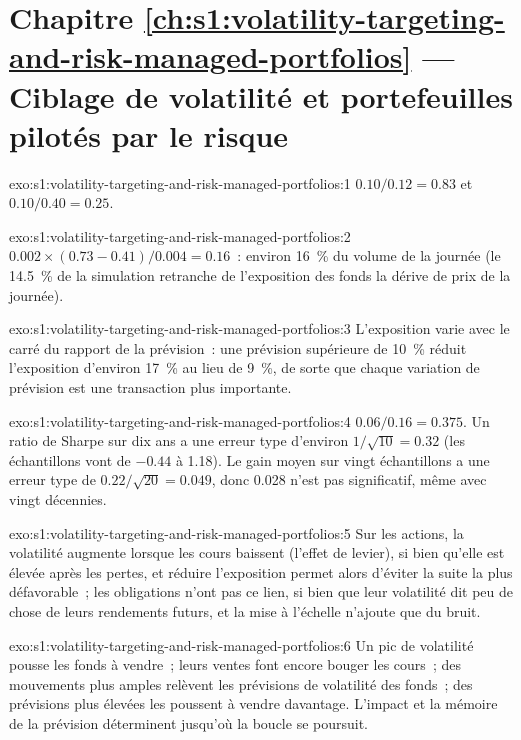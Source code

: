 \section*{Chapitre \ref{ch:s1:volatility-targeting-and-risk-managed-portfolios} --- Ciblage de volatilité et portefeuilles pilotés par le risque}

\begin{solution}{exo:s1:volatility-targeting-and-risk-managed-portfolios:1}
$0.10/0.12 = 0.83$ et $0.10/0.40 = 0.25$.
\end{solution}

\begin{solution}{exo:s1:volatility-targeting-and-risk-managed-portfolios:2}
$0.002 \times (0.73 - 0.41)/0.004 = 0.16$~: environ 16~\% du volume de la journée (le 14.5~\% de la simulation retranche de l'exposition des fonds la dérive de prix de la journée).
\end{solution}

\begin{solution}{exo:s1:volatility-targeting-and-risk-managed-portfolios:3}
L'exposition varie avec le carré du rapport de la prévision~: une prévision supérieure de 10~\% réduit l'exposition d'environ 17~\% au lieu de 9~\%, de sorte que chaque variation de prévision est
une transaction plus importante.
\end{solution}

\begin{solution}{exo:s1:volatility-targeting-and-risk-managed-portfolios:4}
$0.06/0.16 = 0.375$. Un ratio de Sharpe sur dix ans a une erreur type d'environ $1/\sqrt{10} = 0.32$ (les échantillons vont de $-0.44$ à 1.18). Le gain moyen sur
vingt échantillons a une erreur type de $0.22/\sqrt{20} = 0.049$, donc 0.028 n'est pas significatif, même avec vingt décennies.
\end{solution}

\begin{solution}{exo:s1:volatility-targeting-and-risk-managed-portfolios:5}
Sur les actions, la volatilité augmente lorsque les cours baissent (l'effet de levier), si bien qu'elle est élevée après les pertes, et réduire l'exposition permet alors d'éviter la suite la plus
défavorable~; les obligations n'ont pas ce lien, si bien que leur volatilité dit peu de chose de leurs rendements futurs, et la mise à l'échelle n'ajoute que du bruit.
\end{solution}

\begin{solution}{exo:s1:volatility-targeting-and-risk-managed-portfolios:6}
Un pic de volatilité pousse les fonds à vendre~; leurs ventes font encore bouger les cours~; des mouvements plus amples relèvent les prévisions de volatilité des fonds~; des prévisions plus élevées
les poussent à vendre davantage. L'impact et la mémoire de la prévision déterminent jusqu'où la boucle se poursuit.
\end{solution}

